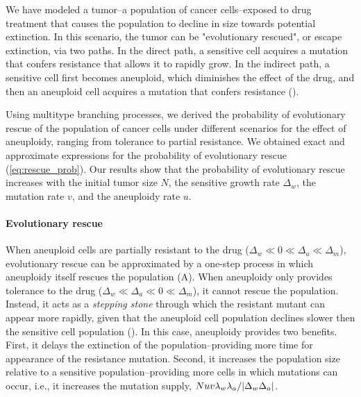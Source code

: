 \documentclass[12pt]{extarticle}
\begin{document}
We have modeled a tumor--a population of cancer cells--exposed to drug treatment that causes the population to decline in size towards potential extinction.
In this scenario, the tumor can be "evolutionary rescued", or escape extinction, via two paths. In the direct path, a sensitive cell acquires a mutation that confers resistance that allows it to rapidly grow. In the indirect path, a sensitive cell first becomes aneuploid, which diminishes the effect of the drug, and then an aneuploid cell acquires a mutation that confers resistance ().

Using multitype branching processes, we derived the probability of evolutionary rescue of the population of cancer cells under different scenarios for the effect of aneuploidy, ranging from tolerance to partial resistance.
We obtained exact and approximate expressions for the probability of evolutionary rescue (\cref{eq:rescue_prob}). 
Our results show that the probability of evolutionary rescue increases with the initial tumor size $N$, the sensitive growth rate $\Delta_w$, the mutation rate $v$, and the aneuploidy rate $u$.

\paragraph{Evolutionary rescue}
When aneuploid cells are partially resistant to the drug ($\Delta_w\ll0\ll\Delta_a\ll\Delta_m$), evolutionary rescue can be approximated by a one-step process in which aneuploidy itself rescues the population (A). 
When aneuploidy only provides tolerance to the drug ($\Delta_w\ll\Delta_a\ll0\ll\Delta_m$), it cannot rescue the population.
Instead, it acts as a \emph{stepping stone} through which the resistant mutant can appear more rapidly, given that the aneuploid cell population declines slower then the sensitive cell population (). In this case, aneuploidy provides two benefits. First, it delays the extinction of the population--providing more time for appearance of the resistance mutation. Second, it increases the population size relative to a sensitive population--providing more cells in which mutations can occur, i.e., it increases the mutation supply, $Nuv\lambda_w\lambda_a/\abs{\Delta_w\Delta_a}$.
\end{document}
